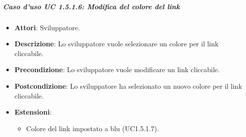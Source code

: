 \subparagraph{Caso d'uso UC 1.5.1.6: Modifica del colore del link}


\FloatBarrier
\begin{itemize}
\item\textbf{Attori}: Sviluppatore.
\item\textbf{Descrizione}: Lo sviluppatore vuole selezionare un colore per il link cliccabile.
\item\textbf{Precondizione}: Lo sviluppatore vuole modificare un link cliccabile.
\item\textbf{Postcondizione}: Lo sviluppatore ha selezionato un nuovo colore per il link cliccabile.
\item\textbf{Estensioni}:
\begin{itemize}

\item Colore del link impostato a blu (UC1.5.1.7).

\end{itemize}

\end{itemize}

